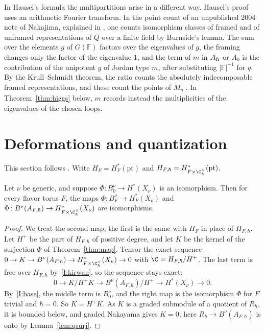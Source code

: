 \documentclass[11pt]{amsart}
\begin{document}
\begin{remark}
In Hausel's formula the multipartitions arise in a different way.  Hausel's
proof uses an arithmetic Fourier transform.  In the point count of an
unpublished 2004 note of Nakajima, explained in \cite[Rem.~3.2]{nakajimaMultipartitionSpaces2026}, one
counts isomorphism classes of framed and of unframed representations of $Q$
over a finite field by Burnside's lemma.  The sum over the elements $g$ of
$G(\mathbb F)$ factors over the eigenvalues of $g$, the framing changes only
the factor of the eigenvalue $1$, and the term of $m$ in $A_{\rm fr}$ or $A_0$
is the contribution of the unipotent $g$ of Jordan type $m$, after
substituting $|\mathbb F|^{-1}$ for $q$.  By the Krull--Schmidt theorem, the
ratio counts the absolutely indecomposable framed representations, and these
count the points of $M_\eta$ \cite{crawley-boeveyAbsolutelyIndecomposable2004}.  In
Theorem~\ref{thm:higgs} below, $m$ records instead the multiplicities of the
eigenvalues of the chosen loops.
\end{remark}

\section{Deformations and quantization}\label{sec:deform}
This section follows .  Write $H_F=H^*_F(\mathrm{pt})$ and
$H_{F,\hbar}=H^*_{F\times\C^\times_\hbar}(\mathrm{pt})$.

\begin{lemma}\label{lem:flavor}
Let $\nu$ be generic, and suppose $\Phi\colon B^\nu_0\to H^*(X_\nu)$ is an
isomorphism.  Then for every flavor torus $F$, the maps
$\Phi\colon B^\nu_F\to H^*_F(X_\nu)$ and
$\Phi\colon B^\nu(A_{F,\hbar})\to H^*_{F\times\C^\times_\hbar}(X_\nu)$ are
isomorphisms.
\end{lemma}

\begin{proof}
We treat the second map; the first is the same with $H_F$ in place of
$H_{F,\hbar}$.  Let $H^+$ be the part of $H_{F,\hbar}$ of positive degree,
and let $K$ be the kernel of the surjection $\Phi$ of Theorem~\ref{thm:map}.
Tensor the exact sequence
$0\to K\to B^\nu(A_{F,\hbar})\to H^*_{F\times\C^\times_\hbar}(X_\nu)\to0$ with
$\C=H_{F,\hbar}/H^+$.  The last term is free over $H_{F,\hbar}$
by~\ref{I:kirwan}, so the sequence stays exact:
\[
 0\to K/H^+K\to B^\nu(A_{F,\hbar})/H^+\to H^*(X_\nu)\to0 .
\]
By~\ref{I:base}, the middle term is $B^\nu_0$, and the right map is the
isomorphism $\Phi$ for $F$ trivial and $\hbar=0$.  So $K=H^+K$.  As $K$ is a
graded submodule of a quotient of $R_\hbar$, it is bounded below, and graded
Nakayama gives $K=0$; here $R_\hbar\to B^\nu(A_{F,\hbar})$ is onto by
Lemma~\ref{lem:qsurj}.
\end{proof}
\end{document}
